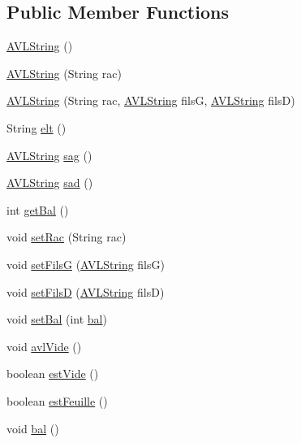 \subsection*{Public Member Functions}
\begin{DoxyCompactItemize}
\item 
\hyperlink{class_a_v_l_string_a7cae60ef637f6aad039371478fc5deed}{A\-V\-L\-String} ()
\item 
\hyperlink{class_a_v_l_string_a03a3566175c444bf44100d4b5ed8ae3e}{A\-V\-L\-String} (String rac)
\item 
\hyperlink{class_a_v_l_string_ad54ef293b3b066f1cfbcfd33b110a523}{A\-V\-L\-String} (String rac, \hyperlink{class_a_v_l_string}{A\-V\-L\-String} fils\-G, \hyperlink{class_a_v_l_string}{A\-V\-L\-String} fils\-D)
\item 
String \hyperlink{class_a_v_l_string_a04e9b58049f335c818886b69ae3ececc}{elt} ()
\item 
\hyperlink{class_a_v_l_string}{A\-V\-L\-String} \hyperlink{class_a_v_l_string_a0c2b74170cea4c3aae4859c9504f8440}{sag} ()
\item 
\hyperlink{class_a_v_l_string}{A\-V\-L\-String} \hyperlink{class_a_v_l_string_a5ed9a9d93f55b1691126934d33b7ff04}{sad} ()
\item 
int \hyperlink{class_a_v_l_string_a9b6514bbe1eeb60cd063038f633638a0}{get\-Bal} ()
\item 
void \hyperlink{class_a_v_l_string_aa1de0f428ebeb20058ac04f03f948220}{set\-Rac} (String rac)
\item 
void \hyperlink{class_a_v_l_string_ac4f52500381c77fb5ec4a1f30cc98f9c}{set\-Fils\-G} (\hyperlink{class_a_v_l_string}{A\-V\-L\-String} fils\-G)
\item 
void \hyperlink{class_a_v_l_string_afe2973bf4e0b311745d8a0e78ce37f87}{set\-Fils\-D} (\hyperlink{class_a_v_l_string}{A\-V\-L\-String} fils\-D)
\item 
void \hyperlink{class_a_v_l_string_af557c5f3b98c3df26a8866e89fd4e173}{set\-Bal} (int \hyperlink{class_a_v_l_string_ae45259bb6e0ecd30b7764c270f2421eb}{bal})
\item 
void \hyperlink{class_a_v_l_string_a822881c4be4ef7e6aada44f6b9b9487a}{avl\-Vide} ()
\item 
boolean \hyperlink{class_a_v_l_string_a82630baa2869275d044e3f25d40d52f7}{est\-Vide} ()
\item 
boolean \hyperlink{class_a_v_l_string_a5f0d9ef42d56854c6977b1e7e143197e}{est\-Feuille} ()
\item 
void \hyperlink{class_a_v_l_string_ae45259bb6e0ecd30b7764c270f2421eb}{bal} ()

\end{DoxyCompactItemize}
